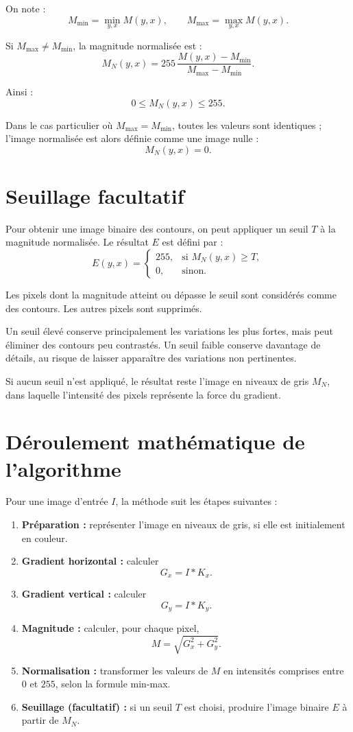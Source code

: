 \documentclass[11pt,a4paper]{article}
\begin{document}
On note :
\[
    M_{\min}=\min_{y,x}M(y,x),
    \qquad
    M_{\max}=\max_{y,x}M(y,x).
\]

Si $M_{\max}\neq M_{\min}$, la magnitude normalisée est :
\[
    M_N(y,x)=
    255\,\frac{M(y,x)-M_{\min}}{M_{\max}-M_{\min}}.
\]

Ainsi :
\[
    0\leq M_N(y,x)\leq255.
\]

Dans le cas particulier où $M_{\max}=M_{\min}$, toutes les valeurs sont
identiques ; l'image normalisée est alors définie comme une image nulle :
\[
    M_N(y,x)=0.
\]

\section{Seuillage facultatif}

Pour obtenir une image binaire des contours, on peut appliquer un seuil
$T$ à la magnitude normalisée. Le résultat $E$ est défini par :
\[
    E(y,x)=
    \begin{cases}
        255, & \text{si } M_N(y,x)\geq T,\\
        0,   & \text{sinon}.
    \end{cases}
\]

Les pixels dont la magnitude atteint ou dépasse le seuil sont considérés
comme des contours. Les autres pixels sont supprimés.

Un seuil élevé conserve principalement les variations les plus fortes,
mais peut éliminer des contours peu contrastés. Un seuil faible conserve
davantage de détails, au risque de laisser apparaître des variations
non pertinentes.

Si aucun seuil n'est appliqué, le résultat reste l'image en niveaux de
gris $M_N$, dans laquelle l'intensité des pixels représente la force du
gradient.

\section{Déroulement mathématique de l'algorithme}

Pour une image d'entrée $I$, la méthode suit les étapes suivantes :
\begin{enumerate}[leftmargin=1.2cm]
    \item \textbf{Préparation :} représenter l'image en niveaux de gris,
    si elle est initialement en couleur.
    \item \textbf{Gradient horizontal :} calculer
    \[
        G_x=I*K_x.
    \]
    \item \textbf{Gradient vertical :} calculer
    \[
        G_y=I*K_y.
    \]
    \item \textbf{Magnitude :} calculer, pour chaque pixel,
    \[
        M=\sqrt{G_x^2+G_y^2}.
    \]
    \item \textbf{Normalisation :} transformer les valeurs de $M$ en
    intensités comprises entre $0$ et $255$, selon la formule min-max.
    \item \textbf{Seuillage (facultatif) :} si un seuil $T$ est choisi,
    produire l'image binaire $E$ à partir de $M_N$.
\end{enumerate}
\end{document}
